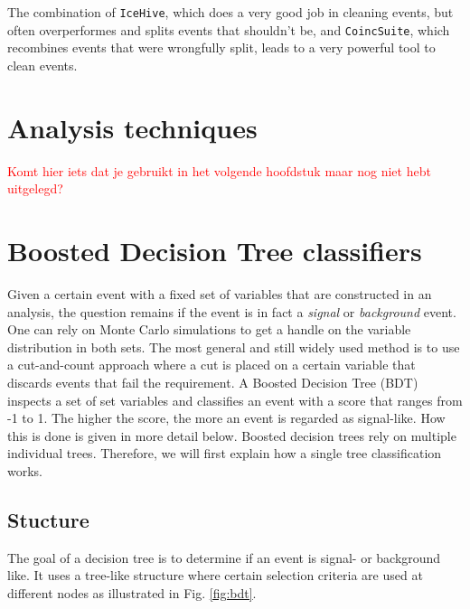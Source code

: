 \vspace{2mm}
\noindent The combination of \texttt{IceHive}, which does a very good job in cleaning events, but often overperformes and splits events that shouldn't be, and \texttt{CoincSuite}, which recombines events that were wrongfully split, leads to a very powerful tool to clean events.

\section{Analysis techniques}
\textcolor{red}{Komt hier iets dat je gebruikt in het volgende hoofdstuk maar nog niet hebt uitgelegd?}
\section{Boosted Decision Tree classifiers}
\label{sec:BDT}
Given a certain event with a fixed set of variables that are constructed in an analysis, the question remains if the event is in fact a \textit{signal} or \textit{background} event. One can rely on Monte Carlo simulations to get a handle on the variable distribution in both sets. The most general and still widely used method is to use a cut-and-count approach where a cut is placed on a certain variable that discards events that fail the requirement. A Boosted Decision Tree (BDT) inspects a set of set variables and classifies an event with a score that ranges from -1 to 1. The higher the score, the more an event is regarded as signal-like. How this is done is given in more detail below. Boosted decision trees rely on multiple individual trees. Therefore, we will first explain how a single tree classification works.


\subsection{Stucture}
The goal of a decision tree is to determine if an event is signal- or background like. It uses a tree-like structure where certain selection criteria are used at different nodes as illustrated in Fig. \ref{fig:bdt}.

